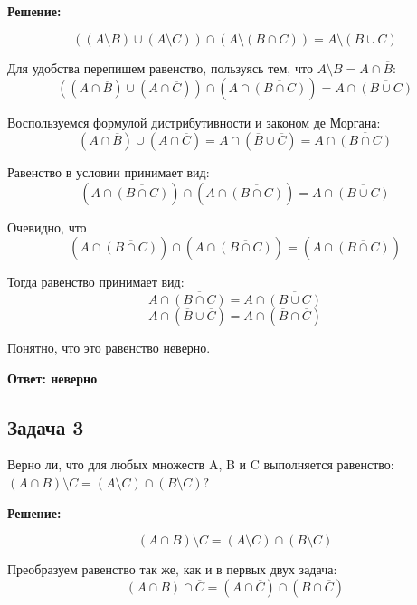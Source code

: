 \documentclass[a4paper,14pt]{article} %
\begin{document}
\begin{center}
\bfseries
{\Large Решение: }
\end{center}

\[((A\setminus B) \cup (A\setminus C)) \cap (A\setminus(B\cap C))=A\setminus (B\cup C)\]

Для удобства перепишем равенство, пользуясь тем, что $A\setminus B = A\cap \overline{B}$:
\[((A\cap \overline{B}) \cup (A\cap \overline{C})) \cap (A\cap \overline{(B\cap C)})=A \cap \overline{(B\cup C)}\]

Воспользуемся формулой дистрибутивности и законом де Моргана:
\[(A\cap \overline{B}) \cup (A\cap \overline{C})= A\cap (\overline{B} \cup \overline{C}) = A\cap \overline{(B \cap C)}\]

Равенство в условии принимает вид:
\[(A\cap \overline{(B \cap C)})\cap (A\cap \overline{(B\cap C)})=A \cap \overline{(B\cup C)}\]

Очевидно, что
\[(A\cap \overline{(B \cap C)})\cap (A\cap \overline{(B\cap C)}) = (A\cap \overline{(B\cap C)})\]

Тогда равенство принимает вид:
\[A\cap \overline{(B\cap C)} = A \cap \overline{(B\cup C)}\]
\[A\cap (\overline{B} \cup \overline{C}) = A \cap (\overline{B} \cap \overline{C})\]


Понятно, что это равенство неверно.

\begin{flushright}
\begin{large}
\textbf {Ответ: неверно}
\end{large}
\end{flushright}

\newpage
\begin{center}
\subsection{Задача 3}
\end{center}

Верно ли, что для любых множеств A, B и C выполняется равенство: $(A \cap B) \setminus C = (A \setminus C) \cap (B \setminus C)?$
\begin{center}
\bfseries
{\Large Решение: }
\end{center}


\[(A\cap B)\setminus C = (A\setminus C) \cap (B\setminus C)\]

Преобразуем равенство так же, как и в первых двух задача:
\[(A\cap B)\cap \overline{C} = (A\cap \overline{C}) \cap (B\cap \overline{C})\]
\end{document}
